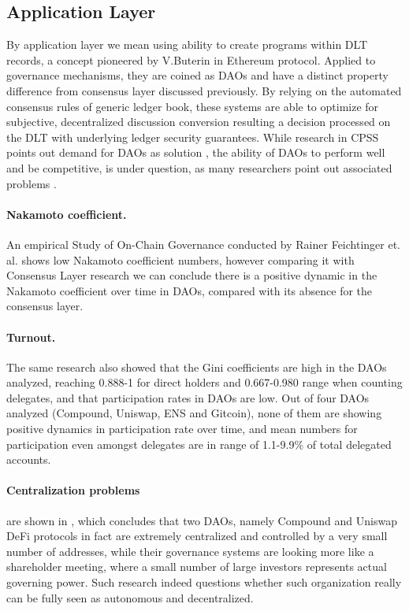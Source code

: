 \documentclass{article}
\begin{document}
\begin{CJK}{UTF8}{gbsn}
\begin{multicols}{2}
        \subsection{Application Layer}
        By application layer we mean using ability to create programs within DLT records, a concept pioneered by V.Buterin in Ethereum protocol. Applied to governance mechanisms, they are coined as DAOs and have a distinct property difference from consensus layer discussed previously. By relying on the automated consensus rules of generic ledger book, these systems are able to optimize for subjective, decentralized discussion conversion resulting a decision processed on the DLT with underlying ledger security guarantees.
        While research in CPSS points out demand for DAOs as solution \cite{Fei2016}\cite{Wang2022}\cite{Juanjuan2023}, the ability of DAOs to perform well and be competitive, is under question, as many researchers point out associated problems \cite{Rainer2023}\cite{Marcella2016}\cite{Xuan2024}.
        \paragraph{Nakamoto coefficient.} An empirical Study of On-Chain Governance conducted by Rainer Feichtinger et. al. \cite{Rainer2023} shows low Nakamoto coefficient numbers, however comparing it with Consensus Layer research \cite{Dominic2023} we can conclude there is a positive dynamic in the Nakamoto coefficient over time in DAOs, compared with its absence for the consensus layer.
        \paragraph{Turnout.} The same research\cite{Rainer2023} also showed that the Gini coefficients\cite{Lidia2012} are high in the DAOs analyzed, reaching 0.888-1 for direct holders and 0.667-0.980 range when counting delegates, and that participation rates in DAOs are low. Out of four DAOs analyzed (Compound, Uniswap, ENS and Gitcoin), none of them are showing positive dynamics in participation rate over time, and mean numbers for participation even amongst delegates are in range of 1.1-9.9\% of total delegated accounts.
        \paragraph{Centralization problems} are shown in \cite{Robin22}, which concludes that two DAOs, namely Compound and Uniswap DeFi protocols in fact are extremely centralized and controlled by a very small number of addresses, while their governance systems are looking more like a shareholder meeting, where a small number of large investors represents actual governing power. Such research indeed questions whether such organization really can be fully seen as autonomous and decentralized.


\end{multicols}
\end{CJK}
\end{document}
